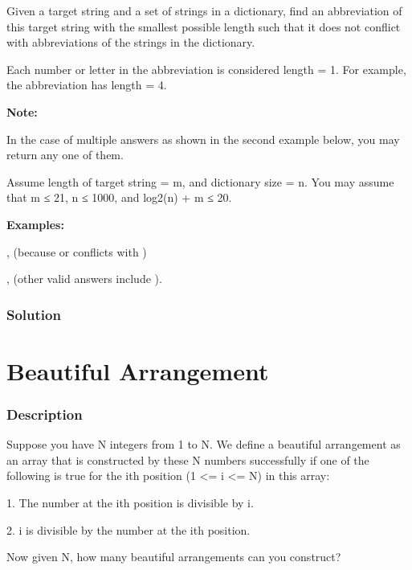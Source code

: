 Given a target string and a set of strings in a dictionary, find an abbreviation of this target string with the smallest possible length such that it does not conflict with abbreviations of the strings in the dictionary.

Each number or letter in the abbreviation is considered length = 1. For example, the abbreviation  has length = 4.

\textbf{Note:}

In the case of multiple answers as shown in the second example below, you may return any one of them.

Assume length of target string = m, and dictionary size = n. You may assume that m ≤ 21, n ≤ 1000, and log2(n) + m ≤ 20.

\textbf{Examples:}

,  (because  or  conflicts with )

,  (other valid answers include ).

\subsubsection{Solution}

\begin{Code}

\end{Code}

\newpage

\section{Beautiful Arrangement} %
\subsubsection{Description}

Suppose you have N integers from 1 to N. We define a beautiful arrangement as an array that is constructed by these N numbers successfully if one of the following is true for the ith position (1 <= i <= N) in this array:

1. The number at the ith position is divisible by i.

2. i is divisible by the number at the ith position.

Now given N, how many beautiful arrangements can you construct?

